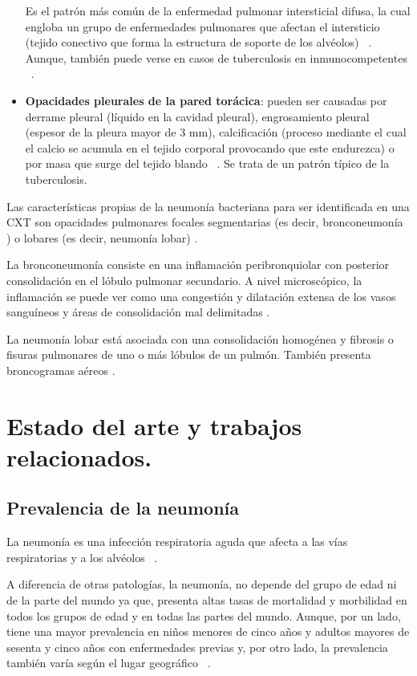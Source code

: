 \begin{itemize}
    Es el patrón más común de la enfermedad pulmonar intersticial difusa, la cual engloba un grupo de enfermedades pulmonares que afectan el intersticio (tejido conectivo que forma la estructura de soporte de los alvéolos) ~\cite{RadioInfo24}. Aunque, también puede verse en casos de tuberculosis en inmunocompetentes ~\cite{gelaw15}. 

    \item \textbf{Opacidades pleurales de la pared torácica}: pueden ser causadas por derrame pleural (líquido en la cavidad pleural), engrosamiento pleural (espesor de la pleura mayor de 3 mm), calcificación (proceso mediante el cual el calcio se acumula en el tejido corporal provocando que este endurezca) o por masa que surge del tejido blando ~\cite{gelaw15, MedlinePlusCalcificación24}. Se trata de un patrón típico de la tuberculosis.
    
\end{itemize}

Las características propias de la neumonía bacteriana para ser identificada  en una CXT son opacidades pulmonares focales segmentarias (es decir, bronconeumonía ) o lobares (es decir, neumonía lobar) \cite{RadiopaediaNeumoBact24}.

La bronconeumonía consiste en una inflamación peribronquiolar con posterior consolidación en el lóbulo pulmonar secundario. A nivel microscópico, la inflamación se puede ver como una congestión y dilatación extensa de los vasos sanguíneos y áreas de consolidación mal delimitadas \cite{RadiopaediaBronconeumonía24}.

La neumonía lobar está asociada con una consolidación homogénea y fibrosis o fisuras pulmonares de uno o más lóbulos de un pulmón. También presenta broncogramas aéreos \cite{RadiopaediaPulmLobar24}.

\section{Estado del arte y trabajos relacionados.}

\subsection{Prevalencia de la neumonía}

La neumonía es una infección respiratoria aguda que afecta a las vías respiratorias y a los alvéolos ~\cite{antoni2021}. 

A diferencia de otras patologías, la neumonía, no depende del grupo de edad ni de la parte del mundo ya que, presenta altas tasas de mortalidad y morbilidad en todos los grupos de edad y en todas las partes del mundo. Aunque, por un lado, tiene una mayor prevalencia en niños menores de cinco años y adultos mayores de sesenta y cinco años con enfermedades previas y, por otro lado, la prevalencia también varía según el lugar geográfico ~\cite{antoni2021}. 

